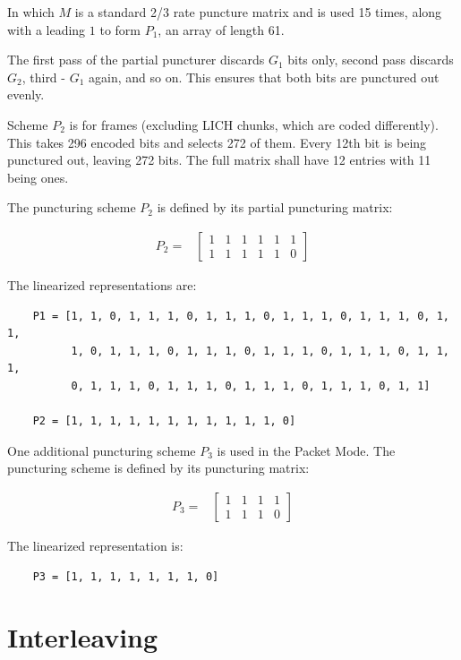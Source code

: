 \documentclass[a4paper,11pt,oneside]{book}
\begin{document}
In which $M$ is a standard 2/3 rate puncture matrix and is used 15 times, along with a leading $1$ to form $P_1$, an array of length 61.

The first pass of the partial puncturer discards $G_1$ bits only, second pass discards $G_2$, third - $G_1$ again, and so on. This ensures that both bits are punctured out evenly.

Scheme $P_2$ is for frames (excluding LICH chunks, which are coded differently). This takes 296 encoded bits and selects 272 of them. Every 12th bit is being punctured out, leaving 272 bits. The full matrix shall have 12 entries with 11 being ones.

The puncturing scheme $P_2$ is defined by its partial puncturing matrix:

\begin{align}
	P_2 = & \begin{bmatrix}
		1 & 1 & 1 & 1 & 1 & 1 \\
		1 & 1 & 1 & 1 & 1 & 0
	\end{bmatrix}
\end{align}

The linearized representations are:

\begin{verbatim}
	P1 = [1, 1, 0, 1, 1, 1, 0, 1, 1, 1, 0, 1, 1, 1, 0, 1, 1, 1, 0, 1, 1,
	      1, 0, 1, 1, 1, 0, 1, 1, 1, 0, 1, 1, 1, 0, 1, 1, 1, 0, 1, 1, 1,
	      0, 1, 1, 1, 0, 1, 1, 1, 0, 1, 1, 1, 0, 1, 1, 1, 0, 1, 1]

	P2 = [1, 1, 1, 1, 1, 1, 1, 1, 1, 1, 1, 0]
\end{verbatim}

One additional puncturing scheme $P_3$ is used in the Packet Mode. The puncturing scheme is defined by its puncturing matrix:

\begin{align}
	P_3 = & \begin{bmatrix}
		1 & 1 & 1 & 1 \\
		1 & 1 & 1 & 0
	\end{bmatrix}
\end{align}

The linearized representation is:

\begin{verbatim}
	P3 = [1, 1, 1, 1, 1, 1, 1, 0]
\end{verbatim}

\chapter{Interleaving} \label{interleaving}
\end{document}
